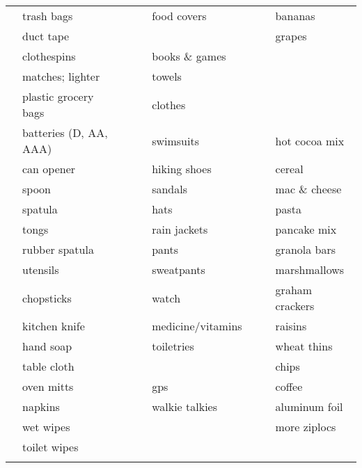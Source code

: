 \documentclass[10pt]{article}
\newcommand{\mybox}{\framebox[4mm]{\textcolor{white} m} \framebox[4mm]{\textcolor{white} m} }
\begin{document}
\begin{tabular}{rlcrlcrl}
\mybox & trash bags             &    &\mybox & food covers          &    &\mybox & bananas \\
\mybox & duct tape              &    &\mybox &                      &    &\mybox & grapes \\ \cline{4-5}
\mybox & clothespins            &    &\mybox & books \& games       &    &\mybox & \\
\mybox & matches; lighter       &    &\mybox & towels               &    &\mybox & \\
\mybox & plastic grocery bags   &    &\mybox & clothes              &    &\mybox & \\ \cline{7-8}
\mybox & batteries (D, AA, AAA) &    &\mybox & swimsuits            &    &\mybox & hot cocoa mix \\ \cline{1-2}
\mybox & can opener             &    &\mybox & hiking shoes         &    &\mybox & cereal \\
\mybox & spoon                  &    &\mybox & sandals              &    &\mybox & mac \& cheese \\
\mybox & spatula                &    &\mybox & hats                 &    &\mybox & pasta \\
\mybox & tongs                  &    &\mybox & rain jackets         &    &\mybox & pancake mix \\
\mybox & rubber spatula         &    &\mybox & pants                &    &\mybox & granola bars \\
\mybox & utensils               &    &\mybox & sweatpants           &    &\mybox & marshmallows \\
\mybox & chopsticks             &    &\mybox & watch                &    &\mybox & graham crackers \\
\mybox & kitchen knife          &    &\mybox & medicine/vitamins    &    &\mybox & raisins \\
\mybox & hand soap              &    &\mybox & toiletries           &    &\mybox & wheat thins \\
\mybox & table cloth            &    &\mybox &                      &    &\mybox & chips \\ \cline{4-5}
\mybox & oven mitts             &    &\mybox & gps                  &    &\mybox & coffee \\
\mybox & napkins                &    &\mybox & walkie talkies       &    &\mybox & aluminum foil \\
\mybox & wet wipes              &    &\mybox &                      &    &\mybox & more ziplocs \\
\mybox & toilet wipes           &    &\mybox &                      &    &\mybox & \\
\mybox & \hspace{1.5in}         &    &\mybox & \hspace{1.5in}       &    &\mybox & \hspace{1.5in} \\ \hline
\end{tabular}
\end{document}
